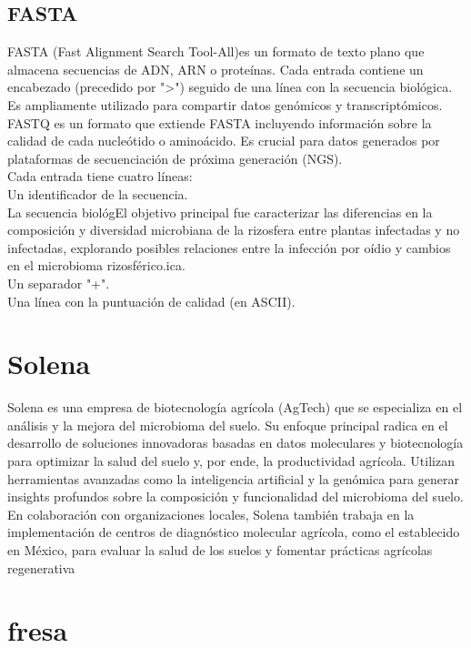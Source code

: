 \subsection{FASTA}
FASTA (Fast Alignment Search Tool-All)es un formato de texto plano que almacena secuencias de ADN, ARN o proteínas. Cada entrada contiene un encabezado (precedido por ">") seguido de una línea con la secuencia biológica. Es ampliamente utilizado para compartir datos genómicos y transcriptómicos.\\

FASTQ es un formato que extiende FASTA incluyendo información sobre la calidad de cada nucleótido o aminoácido. Es crucial para datos generados por plataformas de secuenciación de próxima generación (NGS).\\
Cada entrada tiene cuatro líneas:\\
Un identificador de la secuencia.\\
La secuencia biológEl objetivo principal fue caracterizar las diferencias en la composición y diversidad microbiana de la rizosfera entre plantas infectadas y no infectadas, explorando posibles relaciones entre la infección por oídio y cambios en el microbioma rizosférico.ica.\\
Un separador "+".\\
Una línea con la puntuación de calidad (en ASCII).\\


\section{Solena}
 
Solena es una empresa de biotecnología agrícola (AgTech) que se especializa en el análisis y la mejora del microbioma del suelo. Su enfoque principal radica en el desarrollo de soluciones innovadoras basadas en datos moleculares y biotecnología para optimizar la salud del suelo y, por ende, la productividad agrícola. Utilizan herramientas avanzadas como la inteligencia artificial y la genómica para generar insights profundos sobre la composición y funcionalidad del microbioma del suelo.\\

En colaboración con organizaciones locales, Solena también trabaja en la implementación de centros de diagnóstico molecular agrícola, como el establecido en México, para evaluar la salud de los suelos y fomentar prácticas agrícolas regenerativa\\


\section{fresa}

